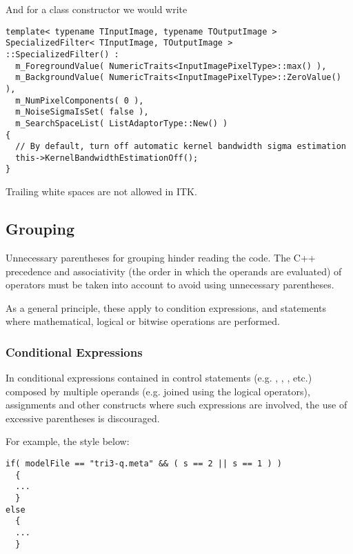 And for a class constructor we would write

\small
\begin{verbatim}
template< typename TInputImage, typename TOutputImage >
SpecializedFilter< TInputImage, TOutputImage >
::SpecializedFilter() :
  m_ForegroundValue( NumericTraits<InputImagePixelType>::max() ),
  m_BackgroundValue( NumericTraits<InputImagePixelType>::ZeroValue() ),
  m_NumPixelComponents( 0 ),
  m_NoiseSigmaIsSet( false ),
  m_SearchSpaceList( ListAdaptorType::New() )
{
  // By default, turn off automatic kernel bandwidth sigma estimation
  this->KernelBandwidthEstimationOff();
}
\end{verbatim}
\normalsize

Trailing white spaces are not allowed in ITK.


\subsection{Grouping}
\label{subsec:Grouping}

Unnecessary parentheses for grouping hinder reading the code.
The C++ precedence and associativity (the order in which the operands are
evaluated) of operators must be taken into account to avoid using unnecessary
parentheses.

As a general principle, these apply to condition expressions, and statements
where mathematical, logical or bitwise operations are performed.


\subsubsection{Conditional Expressions}
\label{subsubsec:ConditionalExpressions}

In conditional expressions contained in control statements (e.g. ,
, , etc.) composed by multiple operands (e.g. joined
using the logical operators), assignments and other constructs where such
expressions are involved, the use of excessive parentheses is discouraged.

For example, the style below:

\small
\begin{verbatim}
if( modelFile == "tri3-q.meta" && ( s == 2 || s == 1 ) )
  {
  ...
  }
else
  {
  ...
  }
\end{verbatim}
\normalsize

